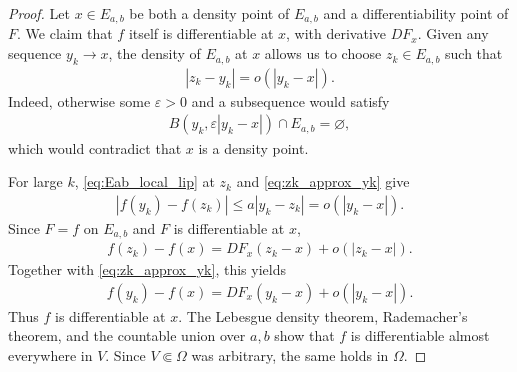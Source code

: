\documentclass[10pt,a4paper]{amsart}
\begin{document}
\begin{proof}
Let \(x\in E_{a,b}\) be both a density point of \(E_{a,b}\) and a
  differentiability point of \(F\).  We claim that \(f\) itself is
differentiable at \(x\), with derivative \(DF_x\).  Given any sequence
\(y_k\to x\), the density of \(E_{a,b}\) at \(x\) allows us to choose
\(z_k\in E_{a,b}\) such that
\begin{align}
|z_k-y_k|=o(|y_k-x|).
\label{eq:zk_approx_yk}
\end{align}
Indeed, otherwise some \(\varepsilon>0\) and a subsequence would
satisfy
\begin{align}
B(y_k,\varepsilon|y_k-x|)\cap E_{a,b}=\varnothing,\nonumber
\end{align}
which would contradict that \(x\) is a density point.  

For large \(k\),
\eqref{eq:Eab_local_lip} at \(z_k\) and
\eqref{eq:zk_approx_yk} give
\begin{align}
|f(y_k)-f(z_k)|
\leq
a|y_k-z_k|
=
o(|y_k-x|).\nonumber
\end{align}
Since \(F=f\) on \(E_{a,b}\) and \(F\) is differentiable at \(x\),
\begin{align}
f(z_k)-f(x)
=
DF_x(z_k-x)+o(|z_k-x|).\nonumber
\end{align}
Together with \eqref{eq:zk_approx_yk}, this yields
\begin{align}
f(y_k)-f(x)
=
DF_x(y_k-x)+o(|y_k-x|).\nonumber
\end{align}
Thus \(f\) is   differentiable at \(x\).  The Lebesgue density
theorem, Rademacher's theorem, and the countable union over \(a,b\) show
that \(f\) is   differentiable almost everywhere in \(V\).
Since \(V\Subset\Omega\) was arbitrary, the same holds in \(\Omega\).


\end{proof}
\end{document}
